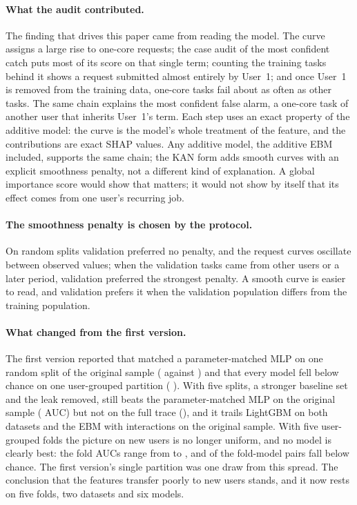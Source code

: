 \paragraph{What the audit contributed.} The finding that drives this paper came from reading the model. The  curve assigns a large rise to one-core requests; the case audit of the most confident catch puts most of its score on that single term; counting the training tasks behind it shows a request submitted almost entirely by User~1; and once User~1 is removed from the training data, one-core tasks fail about as often as other tasks. The same chain explains the most confident false alarm, a one-core task of another user that inherits User~1's term. Each step uses an exact property of the additive model: the curve is the model's whole treatment of the feature, and the contributions are exact SHAP values. Any additive model, the additive EBM included, supports the same chain; the KAN form adds smooth curves with an explicit smoothness penalty, not a different kind of explanation. A global importance score would show that  matters; it would not show by itself that its effect comes from one user's recurring job.

\paragraph{The smoothness penalty is chosen by the protocol.} On random splits validation preferred no penalty, and the request curves oscillate between observed values; when the validation tasks came from other users or a later period, validation preferred the strongest penalty. A smooth curve is easier to read, and validation prefers it when the validation population differs from the training population.

\paragraph{What changed from the first version.} The first version reported that \kaam{} matched a parameter-matched MLP on one random split of the original sample ( against ) and that every model fell below chance on one user-grouped partition (\kaam{} ). With five splits, a stronger baseline set and the leak removed, \kaam{} still beats the parameter-matched MLP on the original sample ( AUC) but not on the full trace (), and it trails LightGBM on both datasets and the EBM with interactions on the original sample. With five user-grouped folds the picture on new users is no longer uniform, and no model is clearly best: the fold AUCs range from  to , and  of the  fold-model pairs fall below chance. The first version's single partition was one draw from this spread. The conclusion that the features transfer poorly to new users stands, and it now rests on five folds, two datasets and six models.
